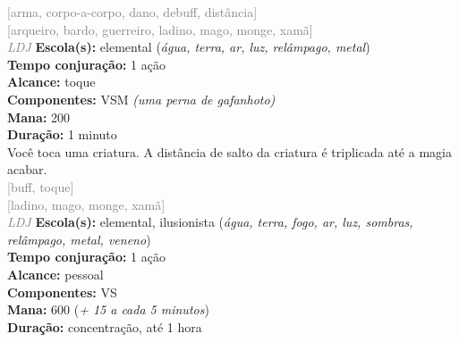 \documentclass{RPG_Adventure}[2021/10/20]
\begin{document}
{\scriptsize \textcolor{gray}{[arma, corpo-a-corpo, dano, debuff, distância]\\}}
{\scriptsize \textcolor{gray}{[arqueiro, bardo, guerreiro, ladino, mago, monge, xamã]\\}}
{\tiny \textcolor{gray}{\textit{LDJ}}}\jump{}
{\small \t \textbf{Escola(s):} elemental (\textit{água, terra, ar, luz, relâmpago, metal})\\\t \textbf{Tempo conjuração:} 1 ação\\\t \textbf{Alcance:} toque\\\t \textbf{Componentes:} VSM \textit{(uma perna de gafanhoto)}\\\t \textbf{Mana:} 200\\\t \textbf{Duração:} 1 minuto\\}
{\normalsize Você toca uma criatura. A distância de salto da criatura é triplicada até a magia acabar.\\}
{\scriptsize \textcolor{gray}{[buff, toque]\\}}
{\scriptsize \textcolor{gray}{[ladino, mago, monge, xamã]\\}}
{\tiny \textcolor{gray}{\textit{LDJ}}}\jump{}
{\small \t \textbf{Escola(s):} elemental, ilusionista (\textit{água, terra, fogo, ar, luz, sombras, relâmpago, metal, veneno})\\\t \textbf{Tempo conjuração:} 1 ação\\\t \textbf{Alcance:} pessoal\\\t \textbf{Componentes:} VS\\\t \textbf{Mana:} 600 (\textit{+ 15 a cada 5 minutos})\\\t \textbf{Duração:} concentração, até 1 hora\\}
\end{document}
